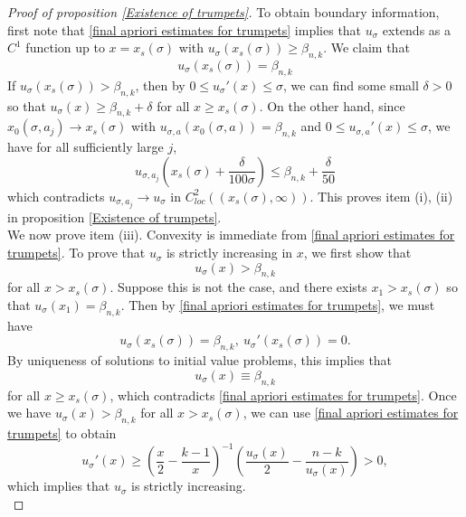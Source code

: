 \documentclass[pdflatex,sn-mathphys-num]{sn-jnl}
\begin{document}
\begin{proof}[Proof of proposition \ref{Existence of trumpets}]
   To obtain boundary information, first note that \eqref{final apriori estimates for trumpets} implies that $u_{\sigma}$ extends as a $C^1$ function up to $x = x_{s}(\sigma)$ with $u_{\sigma}(x_{s}(\sigma)) \geq \beta_{n,k}$. We claim that 
   $$u_{\sigma}(x_{s}(\sigma)) = \beta_{n,k}$$
   If $u_{\sigma}(x_{s}(\sigma)) > \beta_{n,k}$, then by $0 \leq u_{\sigma}'(x) \leq \sigma$, we can find some small $\delta > 0$ so that 
   $u_{\sigma}(x) \geq \beta_{n,k} + \delta$
for all $x \geq x_s(\sigma)$. On the other hand, since $x_0(\sigma, a_j) \to x_{s}(\sigma)$ with $u_{\sigma, a}(x_0(\sigma, a)) = \beta_{n,k}$ and $0 \leq u_{\sigma, a}'(x) \leq \sigma$, we have for all sufficiently large $j$, 
\begin{equation}
    u_{\sigma, a_j}(x_{s}(\sigma) + \frac{\delta}{100\sigma}) \leq \beta_{n,k} + \frac{\delta}{50}
\end{equation}
which contradicts $u_{\sigma, a_j} \to u_{\sigma}$ in $C^2_{loc}((x_s(\sigma), \infty))$.
This proves item (i), (ii) in proposition \ref{Existence of trumpets}. \\

We now prove item (iii). Convexity is immediate from \eqref{final apriori estimates for trumpets}.
To prove that $u_{\sigma}$ is strictly increasing in $x$, 
we first show that 
\begin{equation}
    u_{\sigma}(x) > \beta_{n,k}
\end{equation}
for all $x > x_s(\sigma)$. Suppose this is not the case, and there exists $x_1 > x_s(\sigma)$ so that $u_{\sigma}(x_1) = \beta_{n,k}$. Then by \eqref{final apriori estimates for trumpets}, we must have 
\begin{equation}
    u_{\sigma}(x_s(\sigma)) = \beta_{n,k}, \ u_{\sigma}'(x_s(\sigma)) = 0.
\end{equation}
By uniqueness of solutions to initial value problems, this implies that 
\begin{equation}
    u_{\sigma}(x) \equiv \beta_{n,k}
\end{equation}
for all $x \geq x_s(\sigma)$, which contradicts \eqref{final apriori estimates for trumpets}. Once we have $u_{\sigma}(x) > \beta_{n,k}$ for all $x > x_s(\sigma)$, we can use \eqref{final apriori estimates for trumpets} to obtain
\begin{equation}
    u_{\sigma}'(x) \geq (\frac{x}{2} - \frac{k-1}{x})^{-1}(\frac{u_{\sigma}(x)}{2} - \frac{n-k}{u_{\sigma}(x)}) > 0,
\end{equation}
which implies that $u_{\sigma}$ is strictly increasing. \\


\end{proof}
\end{document}

